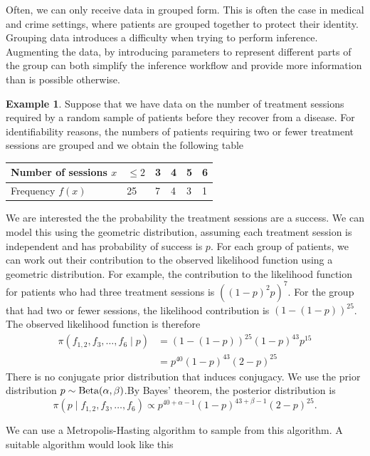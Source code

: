\documentclass[
]{book}
\theoremstyle{definition}
\theoremstyle{definition}
\newtheorem{example}{Example}[chapter]
\theoremstyle{definition}
\theoremstyle{definition}
\theoremstyle{remark}
\begin{document}
Often, we can only receive data in grouped form. This is often the case in medical and crime settings, where patients are grouped together to protect their identity. Grouping data introduces a difficulty when trying to perform inference. Augmenting the data, by introducing parameters to represent different parts of the group can both simplify the inference workflow and provide more information than is possible otherwise.

\begin{example}
Suppose that we have data on the number of treatment sessions required by a random sample of patients before they recover from a disease. For identifiability reasons, the numbers of patients requiring two or fewer treatment sessions are grouped and we obtain the following table

\begin{longtable}[]{@{}llllll@{}}
\toprule\noalign{}
Number of sessions \(x\) & \(\leq 2\) & 3 & 4 & 5 & 6 \\
\midrule\noalign{}
\endhead
\bottomrule\noalign{}
\endlastfoot
Frequency \(f(x)\) & 25 & 7 & 4 & 3 & 1 \\
\end{longtable}

We are interested the the probability the treatment sessions are a success. We can model this using the geometric distribution, assuming each treatment session is independent and has probability of success is \(p\). For each group of patients, we can work out their contribution to the observed likelihood function using a geometric distribution. For example, the contribution to the likelihood function for patients who had three treatment sessions is \(((1-p)^2p)^7\). For the group that had two or fewer sessions, the likelihood contribution is \((1-(1-p))^{25}\). The observed likelihood function is therefore
\begin{align*}
\pi(f_{1, 2}, f_3, \ldots, f_6 \mid p) &= (1-(1-p))^{25}(1-p)^{43}p^{15} \\
&= p^{40}(1-p)^{43}(2-p)^{25}
\end{align*}
There is no conjugate prior distribution that induces conjugacy. We use the prior distribution \(p \sim \hbox{Beta}(\alpha, \beta)\).By Bayes' theorem, the posterior distribution is
\[
\pi(p \mid f_{1, 2}, f_3, \ldots, f_6 ) \propto p^{40 + \alpha - 1}(1-p)^{43 + \beta - 1}(2-p)^{25}.
\]

We can use a Metropolis-Hasting algorithm to sample from this algorithm. A suitable algorithm would look like this


\end{example}
\end{document}
